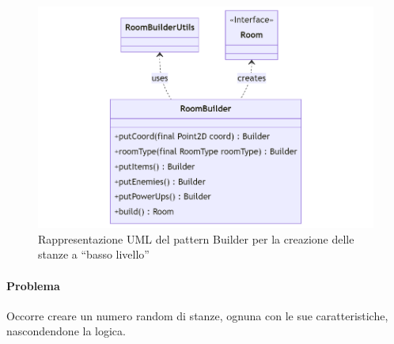 \documentclass[a4paper,12pt]{report}
\begin{document}
\begin{figure}[H]
    \centering{}
    \includegraphics[scale=0.5]{diagram/roombuilder.png}
    \caption{Rappresentazione UML del pattern Builder per la creazione delle stanze a ``basso livello''}
    \label{img:roomBuilder}
\end{figure}


\paragraph{Problema} Occorre creare un numero random di stanze, ognuna con le sue caratteristiche, nascondendone la logica.
\end{document}
